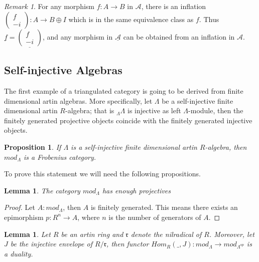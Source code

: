 \documentclass[11pt]{article}
\newtheorem{lemma}[theorem]{Lemma}
\newtheorem{prop}[theorem]{Proposition}
\theoremstyle{definition}
\theoremstyle{remark}
\newtheorem*{remark}{Remark}
\begin{document}
            \begin{remark}
                For any morphism $f:A\rightarrow B$ in $\mathcal{A}$, there is an inflation $\begin{pmatrix}f \\ -i \end{pmatrix}:A\rightarrow B\oplus I$ which is in the same equivalence class as $f$. Thus $\underline{f}=\underline{\begin{pmatrix}f \\ -i \end{pmatrix}}$, and any morphism in $\underline{\mathcal{A}}$ can be obtained from an inflation in $\mathcal{A}$.
            \end{remark}

        \subsection{Self-injective Algebras}

            The first example of a triangulated category is going to be derived from finite dimensional artin algebras. More specifically, let $\Lambda$ be a self-injective finite dimensional artin $R$-algebra; that is $_{\Lambda}\Lambda$ is injective as left $\Lambda$-module, then the finitely generated projective objects coincide with the finitely generated injective objects.

            \begin{prop}
                If $\Lambda$ is a self-injective finite dimensional artin $R$-algebra, then $mod_{\Lambda}$ is a Frobenius category.
            \end{prop}

            To prove this statement we will need the following propositions.

            \begin{lemma}
                The category $mod_{\Lambda}$ has enough projectives
            \end{lemma}

            \begin{proof}
                Let $A:mod_{\Lambda}$, then $A$ is finitely generated. This means there exists an epimorphism $p:R^n\rightarrow A$, where $n$ is the number of generators of $A$.
            \end{proof}

            \begin{lemma}
                Let $R$ be an artin ring and $\mathfrak{r}$ denote the nilradical of $R$. Moreover, let $J$ be the injective envelope of $R/\mathfrak{r}$, then functor $Hom_R(\_,J):mod_{\Lambda}\rightarrow mod_{\Lambda^{op}}$ is a duality.
            \end{lemma}
\end{document}
